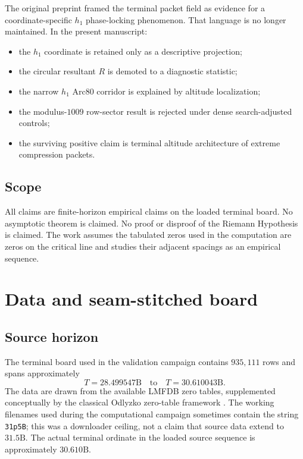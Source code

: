 \documentclass[11pt]{article}
\newcommand{\terminalrows}{935{,}111}
\newcommand{\terminalmin}{28.499547\mathrm{B}}
\newcommand{\terminalmax}{30.610043\mathrm{B}}
\begin{document}
The original preprint framed the terminal packet field as evidence for a coordinate-specific \(h_1\) phase-locking phenomenon. That language is no longer maintained. In the present manuscript:
\begin{itemize}
    \item the \(h_1\) coordinate is retained only as a descriptive projection;
    \item the circular resultant \(R\) is demoted to a diagnostic statistic;
    \item the narrow \(h_1\) Arc80 corridor is explained by altitude localization;
    \item the modulus-\(1009\) row-sector result is rejected under dense search-adjusted controls;
    \item the surviving positive claim is terminal altitude architecture of extreme compression packets.
\end{itemize}

\subsection{Scope}

All claims are finite-horizon empirical claims on the loaded terminal board. No asymptotic theorem is claimed. No proof or disproof of the Riemann Hypothesis is claimed. The work assumes the tabulated zeros used in the computation are zeros on the critical line and studies their adjacent spacings as an empirical sequence.

\section{Data and seam-stitched board}

\subsection{Source horizon}

The terminal board used in the validation campaign contains \(\terminalrows\) rows and spans approximately
\[
T = \terminalmin \quad \text{to} \quad T = \terminalmax.
\]
The data are drawn from the available LMFDB zero tables, supplemented conceptually by the classical Odlyzko zero-table framework \cite{lmfdb,odlyzko_tables}. The working filenames used during the computational campaign sometimes contain the string \texttt{31p5B}; this was a downloader ceiling, not a claim that source data extend to \(31.5\mathrm{B}\). The actual terminal ordinate in the loaded source sequence is approximately \(30.610\mathrm{B}\).
\end{document}
